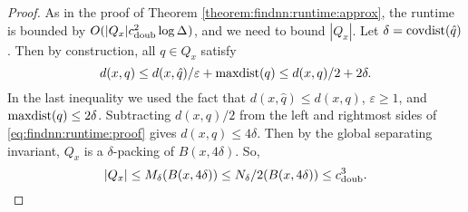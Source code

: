 \documentclass[../main.tex]{subfiles}
\newcommand{\dist}[2]{\distf({#1},{#2})}
\newcommand{\distf}{d}
\newcommand{\aspect}[1]{\Delta_{#1}}
\newcommand{\cdoub}{c_\textnormal{doub}}
\newcommand{\chole}{c_\textnormal{hole}}
\newcommand{\mkfunction}[1]{\ifmmode{\textnormal{{#1}}}}
\newcommand{\covdist}[1]    {\mkfunction{covdist}({#1})}
\newcommand{\maxdist}[1]    {\mkfunction{maxdist}({#1})}
\newcommand{\mkprocedure}[1]{\textnormal{\ttfamily {#1}}}
\newcommand{\findnn}{\mkprocedure{findnn}}
\begin{document}
\begin{proof}
    As in the proof of Theorem \ref{theorem:findnn:runtime:approx}, 
    the runtime is bounded by $O(|Q_x|\cdoub^2\log\aspect{})$,
    and we need to bound $|Q_x|$.
    Let $\delta=\covdist{\hat q}$.
    Then by construction, all $q\in Q_x$ satisfy
    \begin{equation}
        \label{eq:findnn:runtime:proof}
        \dist{x}{q} 
        \le \dist{x}{\hat q}/\varepsilon + \maxdist{q}
        \le \dist{x}{q}/2 + 2\delta
        .
    \end{equation}
    In the last inequality we used the fact that $\dist{x}{\hat q} \le \dist{x}{q}$, 
    $\varepsilon\ge 1$,
    and $\maxdist{q}\le2\delta$.
    Subtracting $\dist{x}{q}/2$ from the left and rightmost sides of \eqref{eq:findnn:runtime:proof} gives $\dist{x}{q} \le 4\delta$.
    Then by the global separating invariant, 
    $Q_x$ is a $\delta$-packing of $B(x,4\delta)$.
    So,
    \begin{equation}
        |Q_x|
        \le M_\delta(B(x,4\delta))
        \le N_\delta/2(B(x,4\delta))
        \le \cdoub^3
        .
    \end{equation}
\end{proof}


\end{document}
